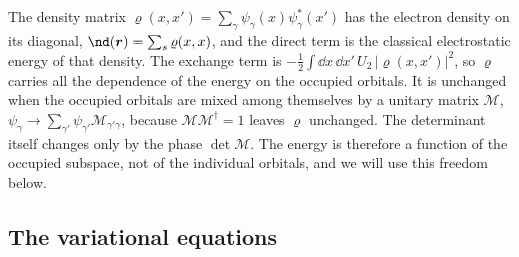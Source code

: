 The density matrix $\varrho(x, x') = \sum_\gamma\psi_\gamma(x)\psi^*_\gamma(x')$ has the electron density on its diagonal, $\nd(\vect{r}) = \sum_s\varrho(x, x)$, and the direct term is the classical electrostatic energy of that density. The exchange term is $-\tfrac12\int\dd x\,\dd x'\,U_2\,|\varrho(x, x')|^2$, so $\varrho$ carries all the dependence of the energy on the occupied orbitals. It is unchanged when the occupied orbitals are mixed among themselves by a unitary matrix $\mathcal{M}$, $\psi_\gamma \to \sum_{\gamma'}\psi_{\gamma'}\mathcal{M}_{\gamma'\gamma}$, because $\mathcal{M}\mathcal{M}^\dagger = 1$ leaves $\varrho$ unchanged. The determinant itself changes only by the phase $\det\mathcal{M}$. The energy is therefore a function of the occupied subspace, not of the individual orbitals, and we will use this freedom below.

\subsection*{The variational equations}

